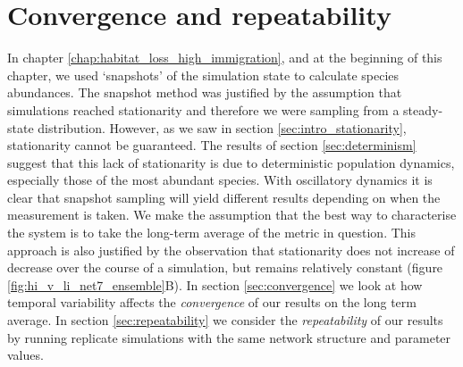 

\newpage
\section{Convergence and repeatability}
\label{sec:reliability}


In chapter \ref{chap:habitat_loss_high_immigration}, and at the beginning of this chapter, we used `snapshots' of the simulation state to calculate species abundances. The snapshot method was justified by the assumption that simulations reached stationarity and therefore we were sampling from a steady-state distribution. However, as we saw in section \ref{sec:intro_stationarity}, stationarity cannot be guaranteed. The results of section \ref{sec:determinism} suggest that this lack of stationarity is due to deterministic population dynamics, especially those of the most abundant species. With oscillatory dynamics it is clear that snapshot sampling will yield different results depending on when the measurement is taken. We make the assumption that the best way to characterise the system is to take the long-term average of the metric in question. This approach is also justified by the observation that stationarity does not increase of decrease over the course of a simulation, but remains relatively constant (figure \ref{fig:hi_v_li_net7_ensemble}B). In section \ref{sec:convergence} we look at how temporal variability affects the \emph{convergence} of our results on the long term average. In section \ref{sec:repeatability} we consider the \emph{repeatability} of our results by running replicate simulations with the same network structure and parameter values.

